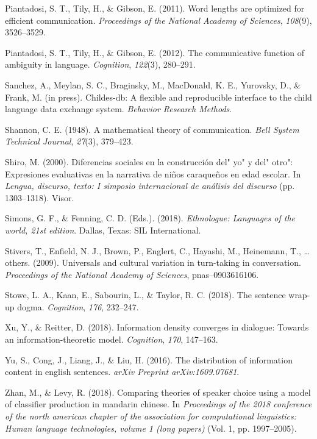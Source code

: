 \documentclass[10pt, letterpaper]{article}
\begin{document}
\leavevmode\hypertarget{ref-piantadosi2011}{}%
Piantadosi, S. T., Tily, H., \& Gibson, E. (2011). Word lengths are
optimized for efficient communication. \emph{Proceedings of the National
Academy of Sciences}, \emph{108}(9), 3526--3529.

\leavevmode\hypertarget{ref-piantadosi2012}{}%
Piantadosi, S. T., Tily, H., \& Gibson, E. (2012). The communicative
function of ambiguity in language. \emph{Cognition}, \emph{122}(3),
280--291.

\leavevmode\hypertarget{ref-sanchez2019}{}%
Sanchez, A., Meylan, S. C., Braginsky, M., MacDonald, K. E., Yurovsky,
D., \& Frank, M. (in press). Childes-db: A flexible and reproducible
interface to the child language data exchange system. \emph{Behavior
Research Methods}.

\leavevmode\hypertarget{ref-shannon1948}{}%
Shannon, C. E. (1948). A mathematical theory of communication.
\emph{Bell System Technical Journal}, \emph{27}(3), 379--423.

\leavevmode\hypertarget{ref-shiro2000}{}%
Shiro, M. (2000). Diferencias sociales en la construcción del" yo" y
del" otro": Expresiones evaluativas en la narrativa de niños caraqueños
en edad escolar. In \emph{Lengua, discurso, texto: I simposio
internacional de análisis del discurso} (pp. 1303--1318). Visor.

\leavevmode\hypertarget{ref-simons2018}{}%
Simons, G. F., \& Fenning, C. D. (Eds.). (2018). \emph{Ethnologue:
Languages of the world, 21st edition}. Dallas, Texas: SIL International.

\leavevmode\hypertarget{ref-stivers2009universals}{}%
Stivers, T., Enfield, N. J., Brown, P., Englert, C., Hayashi, M.,
Heinemann, T., \ldots{} others. (2009). Universals and cultural
variation in turn-taking in conversation. \emph{Proceedings of the
National Academy of Sciences}, pnas--0903616106.

\leavevmode\hypertarget{ref-stowe2018}{}%
Stowe, L. A., Kaan, E., Sabourin, L., \& Taylor, R. C. (2018). The
sentence wrap-up dogma. \emph{Cognition}, \emph{176}, 232--247.

\leavevmode\hypertarget{ref-xu2018}{}%
Xu, Y., \& Reitter, D. (2018). Information density converges in
dialogue: Towards an information-theoretic model. \emph{Cognition},
\emph{170}, 147--163.

\leavevmode\hypertarget{ref-yu2016}{}%
Yu, S., Cong, J., Liang, J., \& Liu, H. (2016). The distribution of
information content in english sentences. \emph{arXiv Preprint
arXiv:1609.07681}.

\leavevmode\hypertarget{ref-zhan2018}{}%
Zhan, M., \& Levy, R. (2018). Comparing theories of speaker choice using
a model of classifier production in mandarin chinese. In
\emph{Proceedings of the 2018 conference of the north american chapter
of the association for computational linguistics: Human language
technologies, volume 1 (long papers)} (Vol. 1, pp. 1997--2005).


\end{document}
